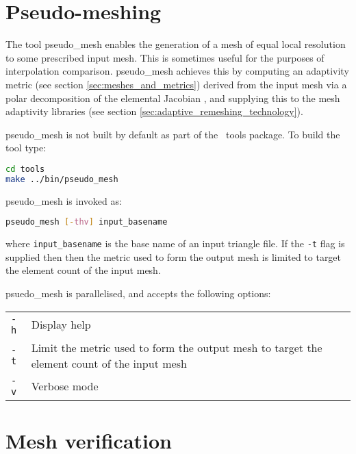 \section{Pseudo-meshing}

The tool pseudo\_mesh enables the generation of a mesh of equal local resolution
to some prescribed input mesh. This is sometimes useful for the purposes of
interpolation comparison. pseudo\_mesh achieves this by computing an adaptivity
metric (see section \ref{sec:meshes_and_metrics}) derived from the input mesh
via a polar decomposition of the
elemental Jacobian \citep{micheletti2006}, and supplying this to the mesh adaptivity libraries
(see section \ref{sec:adaptive_remeshing_technology}).

pseudo\_mesh is not built by default as part of the \fluidity\ tools package. To
build the tool type:

\begin{lstlisting}[language = Bash]
cd tools
make ../bin/pseudo_mesh
\end{lstlisting}

pseudo\_mesh is invoked as:

\begin{lstlisting}[language = Bash]
pseudo_mesh [-thv] input_basename
\end{lstlisting}

where \lstinline[language = Bash]*input_basename* is the base name of an input
triangle file. If the \lstinline[language = Bash]*-t* flag is supplied then
then the metric used to form the output mesh is limited to target the element
count of the input mesh.

psuedo\_mesh is parallelised, and accepts the following options:

\begin{center}
  \begin{tabular}{lp{}}
    \hline
    \lstinline+-h+   & Display help \\
    \lstinline+-t+   & Limit the metric used to form the output mesh to
    target the element count of the input mesh \\
    \lstinline+-v+   & Verbose mode \\
    \hline
  \end{tabular}
\end{center}

\section{Mesh verification}


